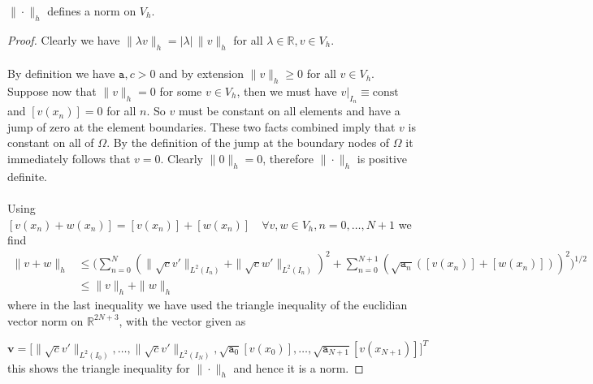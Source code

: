 \begin{lemma}
	$\|\cdot\|_h$ defines a norm on $V_h$.
\end{lemma}
\begin{proof}
	Clearly we have $\|\lambda v\|_h =|\lambda|\, \|v\|_h$ for all $\lambda \in \mathbb{R}, v\in V_h$. \\ \\
	By definition we have $\texttt{a}, c>0$ and by extension $\|v\|_h \geq 0$ for all
	$v\in V_h$. Suppose now that $\|v\|_h = 0$ for some $v\in V_h$, then we must have $v|_{I_n} \equiv \text{const}$
	and $[v(x_n)] = 0$ for all $n$. So $v$ must be constant on all elements and have a jump of zero at the element boundaries.
	These two facts combined imply that $v$ is constant on all of $\Omega$. By the definition of the jump
	at the boundary nodes of $\Omega$ it immediately follows that $v=0$. Clearly
	$\|0\|_h=0$, therefore $\|\cdot\|_h$ is positive definite. \\ \\
	Using $[v(x_n) + w(x_n)] = [v(x_n)] + [w(x_n)] \quad \forall v,w \in V_h, n = 0,\ldots,N+1$ we find
	\begin{align*}
		\|v+w\|_h & \leq \Big(\sum_{n=0}^{N} (\|\sqrt{c}v'\|_{L^2(I_n)}+\|\sqrt{c}w'\|_{L^2(I_n)})^2 +
		\sum_{n=0}^{N+1} (\sqrt{\texttt{a}_n}([v(x_n)] + [w(x_n)]))^2\Big)^{1/2}                       \\
		          & \leq \|v\|_h + \|w\|_h
	\end{align*}
	where in the last inequality we have used the triangle inequality of the euclidian vector norm on $\mathbb{R}^{2N+3}$, with the vector given
	as

	\[
		\textbf{v} = \big[\|\sqrt{c}v'\|_{L^2(I_0)},\ldots,\|\sqrt{c}v'\|_{L^2(I_N)}, \sqrt{\texttt{a}_0}[v(x_0)],\ldots,\sqrt{\texttt{a}_{N+1}}[v(x_{N+1})]\big]^T
	\]
	this shows the triangle inequality for $\|\cdot\|_h$ and hence it is a norm.
\end{proof}

